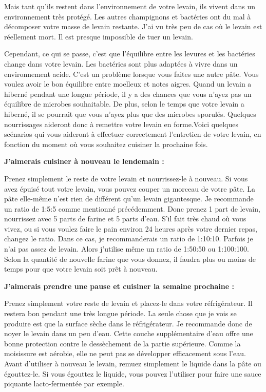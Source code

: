 Mais tant qu'ils restent dans l'environnement de votre levain, ils vivent dans un environnement très protégé. Les autres champignons et bactéries ont du mal à décomposer votre masse de levain restante. J'ai vu très peu de cas où le levain est réellement mort. Il est presque impossible de tuer un levain.

Cependant, ce qui se passe, c'est que l'équilibre entre les levures et les bactéries change dans votre levain. Les bactéries sont plus adaptées à vivre dans un environnement acide. C'est un problème lorsque vous faites une autre pâte. Vous voulez avoir le bon équilibre entre moelleux et notes aigres. 
Quand un levain a hiberné pendant une longue période, il y a des chances que vous n'ayez pas un équilibre de microbes souhaitable. De plus, selon le temps que votre levain a hiberné, il se pourrait que vous n'ayez plus que des microbes sporulés. Quelques nourrissages aideront donc à remettre votre levain en forme.Voici quelques scénarios qui vous aideront à effectuer correctement l'entretien de votre levain, en fonction du moment où vous souhaitez cuisiner la prochaine fois.

\textbf{J'aimerais cuisiner à nouveau le lendemain :}

Prenez simplement le reste de votre levain et nourrissez-le à nouveau. Si vous avez épuisé
tout votre levain, vous pouvez couper un morceau de votre pâte. La pâte elle-même n'est
rien de différent qu'un levain gigantesque. Je recommande un ratio de 1:5:5 comme
mentionné précédemment. Donc prenez 1 part de levain, nourrissez avec 5 parts de farine et 5
parts d'eau. S'il fait très chaud où vous vivez, ou si vous voulez faire le
pain environ 24 heures après votre dernier repas, changez le ratio. Dans ce cas, je recommanderais un ratio de 1:10:10. Parfois je n'ai pas assez de levain.
Alors j'utilise même un ratio de 1:50:50 ou 1:100:100. Selon la quantité de nouvelle
farine que vous donnez, il faudra plus ou moins de temps pour que votre levain soit prêt à nouveau.

\textbf{J'aimerais prendre une pause et cuisiner la semaine prochaine :}

Prenez simplement votre reste de levain et placez-le dans votre réfrigérateur. Il restera bon
pendant une très longue période. La seule chose que je vois se produire est que la surface
sèche dans le réfrigérateur. Je recommande donc de noyer le levain dans un peu d'eau. Cette couche supplémentaire d'eau offre une bonne protection contre le dessèchement de la partie supérieure. Comme la moisissure est aérobie, elle ne peut pas se développer efficacement sous
l'eau. Avant d'utiliser à nouveau le levain, remuez simplement le liquide dans la pâte ou égouttez-le. Si vous égouttez le liquide, vous pouvez l'utiliser
pour faire une sauce piquante lacto-fermentée par exemple.

